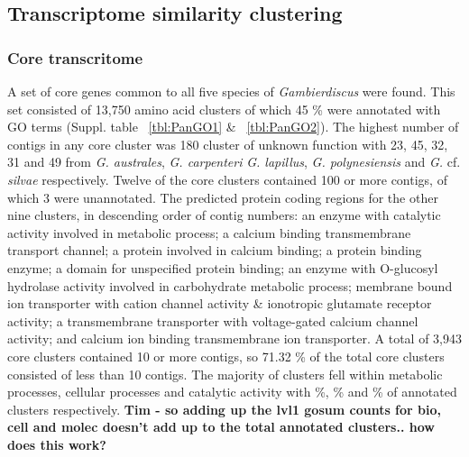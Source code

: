 \documentclass[12pt]{article}
\begin{document}
\subsection*{Transcriptome similarity clustering}
\subsubsection*{Core transcritome}
A set of core genes common to all five species of \textit{Gambierdiscus} were found. 
This set consisted of 13,750 amino acid clusters of which 45 \% were annotated with GO terms (Suppl. table ~\ref{tbl:PanGO1} \& ~\ref{tbl:PanGO2}). 
The highest number of contigs in any core cluster was 180 cluster of unknown function with 23, 45, 32, 31 and 49 from \textit{G. australes}, \textit{G. carpenteri} \textit{G. lapillus}, \textit{G. polynesiensis} and \textit{G.} cf. \textit{silvae} respectively. 
Twelve of the core clusters contained 100 or more contigs, of which 3 were unannotated. 
The predicted protein coding regions for the other nine clusters, in descending order of contig numbers: an enzyme with catalytic activity involved in metabolic process; a calcium binding transmembrane transport channel; a protein involved in calcium binding; a protein binding enzyme; a domain for unspecified protein binding; an enzyme with O-glucosyl hydrolase activity involved in carbohydrate metabolic process; membrane bound ion transporter with cation channel activity \& ionotropic glutamate receptor activity; a transmembrane transporter with voltage-gated calcium channel activity; and calcium ion binding transmembrane ion transporter. 
A total of 3,943 core clusters contained 10 or more contigs, so 71.32 \% of the total core clusters consisted of less than 10 contigs. 
The majority of  clusters fell within metabolic processes, cellular processes and catalytic activity with \%, \% and \% of annotated clusters respectively. \textbf{Tim - so adding up the lvl1 gosum counts for bio, cell and molec doesn't add up to the total annotated clusters.. how does this work?}
\end{document}
